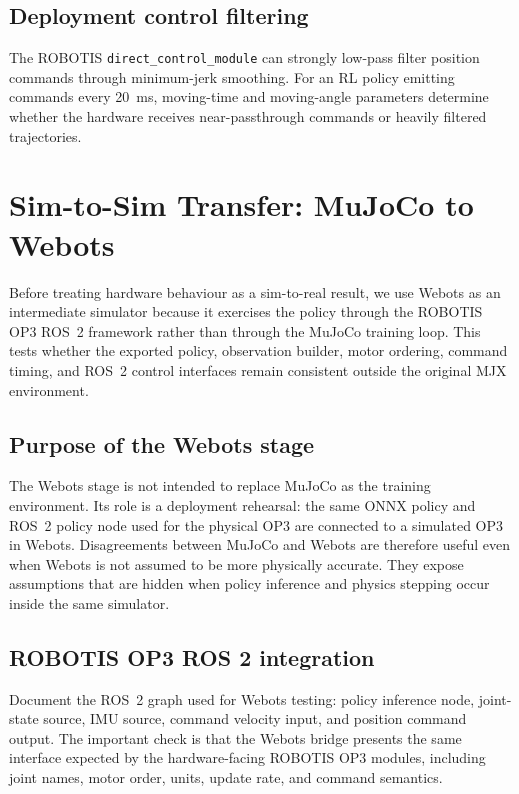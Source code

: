 \subsection{Deployment control filtering}

The ROBOTIS \texttt{direct\_control\_module} can strongly low-pass filter position commands through minimum-jerk smoothing. For an RL policy emitting commands every 20~ms, moving-time and moving-angle parameters determine whether the hardware receives near-passthrough commands or heavily filtered trajectories.

\section{Sim-to-Sim Transfer: MuJoCo to Webots}
\label{sec:sim2sim}

Before treating hardware behaviour as a sim-to-real result, we use Webots as an intermediate simulator because it exercises the policy through the ROBOTIS OP3 ROS~2 framework rather than through the MuJoCo training loop. This tests whether the exported policy, observation builder, motor ordering, command timing, and ROS~2 control interfaces remain consistent outside the original MJX environment.

\subsection{Purpose of the Webots stage}

The Webots stage is not intended to replace MuJoCo as the training environment. Its role is a deployment rehearsal: the same ONNX policy and ROS~2 policy node used for the physical OP3 are connected to a simulated OP3 in Webots. Disagreements between MuJoCo and Webots are therefore useful even when Webots is not assumed to be more physically accurate. They expose assumptions that are hidden when policy inference and physics stepping occur inside the same simulator.

\subsection{ROBOTIS OP3 ROS 2 integration}

Document the ROS~2 graph used for Webots testing: policy inference node, joint-state source, IMU source, command velocity input, and position command output. The important check is that the Webots bridge presents the same interface expected by the hardware-facing ROBOTIS OP3 modules, including joint names, motor order, units, update rate, and command semantics.

